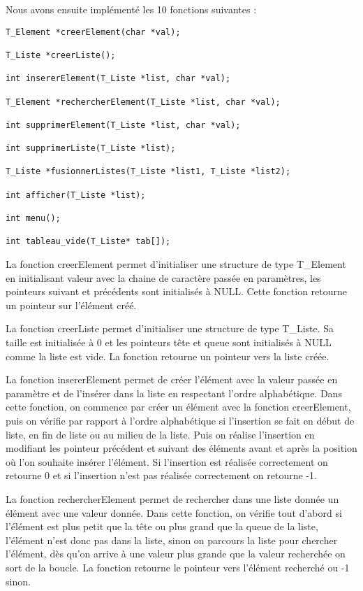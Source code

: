 \documentclass[11pt]{report}
\begin{document}
Nous avons ensuite implémenté les 10 fonctions suivantes :
\begin{lstlisting}
T_Element *creerElement(char *val);

T_Liste *creerListe();

int insererElement(T_Liste *list, char *val);

T_Element *rechercherElement(T_Liste *list, char *val);

int supprimerElement(T_Liste *list, char *val);

int supprimerListe(T_Liste *list);

T_Liste *fusionnerListes(T_Liste *list1, T_Liste *list2);

int afficher(T_Liste *list);

int menu();

int tableau_vide(T_Liste* tab[]);

\end{lstlisting}

La fonction creerElement permet d'initialiser une structure de type T\_Element en initialisant valeur avec la chaine de caractère passée en paramètres, les pointeurs suivant et précédents sont initialisés à NULL. Cette fonction retourne un pointeur sur l’élément créé.

\medskip

La fonction creerListe permet d’initialiser une structure de type T\_Liste. Sa taille est initialisée à 0 et les pointeurs tête et queue sont initialisés à NULL comme la liste est vide. La fonction retourne un pointeur vers la liste créée.

\medskip

La fonction insererElement permet de créer l’élément avec la valeur passée en paramètre et de l'insérer dans la liste en respectant l'ordre alphabétique. Dans cette fonction, on commence par créer un élément avec la fonction creerElement, puis on vérifie par rapport à l'ordre alphabétique si l'insertion se fait en début de liste, en fin de liste ou au milieu de la liste. Puis on réalise l'insertion en modifiant les pointeur précédent et suivant des éléments avant et après la position où l'on souhaite insérer l'élément.
Si l'insertion est réalisée correctement on retourne 0 et si l'insertion n'est pas réalisée correctement on retourne -1.

\medskip

La fonction rechercherElement permet de rechercher dans une liste donnée un élément avec une valeur donnée. Dans cette fonction, on vérifie tout d'abord si l’élément est plus petit que la tête ou plus grand que la queue de la liste, l'élément n'est donc pas dans la liste, sinon on parcours la liste pour chercher l'élément, dès qu'on arrive à une valeur plus grande que la valeur recherchée on sort de la boucle. La fonction retourne le pointeur vers l'élément recherché ou -1 sinon.
\end{document}
